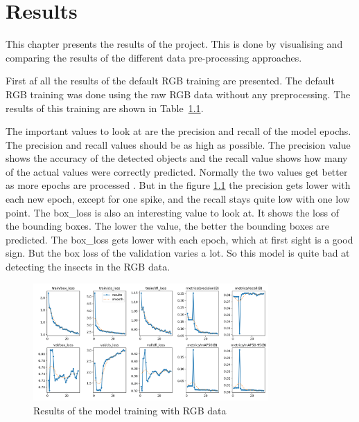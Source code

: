 \chapter{Results}
\label{ch:results}


This chapter presents the results of the project. This is done by visualising and comparing the results of the different data pre-processing approaches.

First af all the results of the default RGB training are presented. The default RGB training was done using the raw RGB data without any preprocessing. The results of this training are shown in Table~\ref{fig:results_rgb}.

The important values to look at are the precision and recall of the model epochs. The precision and recall values should be as high as possible. The precision value shows the accuracy of the detected objects and the recall value shows how many of the actual values were correctly predicted. Normally the two values get better as more epochs are processed \citep{ultralyticsYOLOPerformance}. But in the figure \ref{fig:results_rgb} the precision gets lower with each new epoch, except for one spike, and the recall stays quite low with one low point.
The box\_loss is also an interesting value to look at. It shows the loss of the bounding boxes. The lower the value, the better the bounding boxes are predicted. The box\_loss gets lower with each epoch, which at first sight is a good sign. But the box loss of the validation varies a lot. So this model is quite bad at detecting the insects in the RGB data.

\begin{figure}[htbp] 
    \centering
    \includegraphics[width=0.8\textwidth]{images/results/rgb_results.png}
    \caption{Results of the model training with RGB data}
    \label{fig:results_rgb}
\end{figure}

